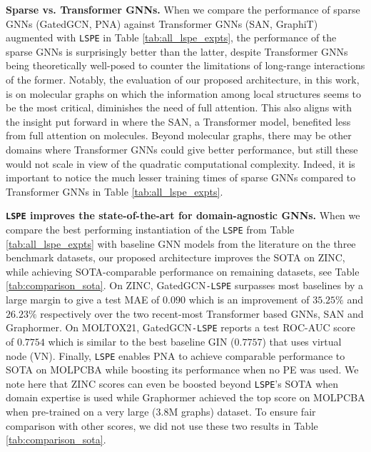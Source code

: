 \documentclass{article} \usepackage{iclr2021_conference,times}
\begin{document}
{\bf Sparse vs. Transformer GNNs.} When we compare the performance of sparse GNNs (GatedGCN, PNA) against Transformer GNNs (SAN, GraphiT) augmented with \texttt{LSPE} in Table \ref{tab:all_lspe_expts}, the performance of the sparse GNNs is surprisingly better than the latter, despite Transformer GNNs being theoretically well-posed to counter the limitations of long-range interactions of the former. Notably, the evaluation of our proposed architecture, in this work, is on molecular graphs on which the information among local structures seems to be the most critical, diminishes the need of full attention. This also aligns with the insight put forward in \cite{kreuzer2021rethinking} where the SAN, a Transformer model, benefited less from full attention on molecules. Beyond molecular graphs, there may be other domains where Transformer GNNs could give better performance, but still these would not scale in view of the quadratic computational complexity. Indeed, it is important to notice the much lesser training times of sparse GNNs compared to Transformer GNNs in Table \ref{tab:all_lspe_expts}.

{\bf \texttt{LSPE} improves the state-of-the-art for domain-agnostic GNNs.} When we compare the best performing instantiation of the \texttt{LSPE} from Table \ref{tab:all_lspe_expts} with baseline GNN models from the literature on the three benchmark datasets, our proposed architecture improves the SOTA on 
ZINC,
while achieving SOTA-comparable performance on 
remaining datasets,
see Table \ref{tab:comparison_sota}. On ZINC, GatedGCN\texttt{-LSPE} surpasses most baselines by a large margin to give a test MAE of $0.090$
which is an improvement of 
$35.25\%$ and $26.23\%$
respectively over the two recent-most Transformer based GNNs, SAN and Graphormer. On MOLTOX21, GatedGCN\texttt{-LSPE} reports a test ROC-AUC score of $0.7754$ which is similar to the best baseline GIN ($0.7757$) that uses virtual node (VN). Finally, \texttt{LSPE} enables PNA to achieve comparable performance to SOTA on MOLPCBA while boosting its performance when no PE was used. We note here that ZINC scores can even be boosted beyond \texttt{LSPE}'s SOTA when domain expertise is used \citep{bouritsas2020improving, bodnar2021weisfeiler} while Graphormer \citep{ying2021transformers} achieved the top score on MOLPCBA when pre-trained on a very large (3.8M graphs) 
dataset. To ensure fair comparison with other scores, we did not use these two results in Table \ref{tab:comparison_sota}.
\end{document}
